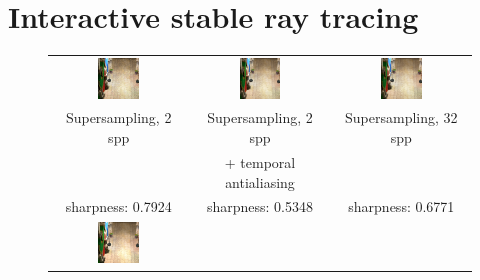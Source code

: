 \section{Interactive stable ray tracing}

\begin{figure}[t]
\begin{tabular}{@{}c@{}c@{}@{}c@{}}
	 \includegraphics[width=0.32\textwidth]{figures/ss_2x_rect_370_300_300_300_frame_211.png} &
		 \includegraphics[width=0.32\textwidth]{figures/ss_2x_taa_rect_370_300_300_300_frame_211.png} &
		  \includegraphics[width=0.32\textwidth]{figures/ss_32x_rect_370_300_300_300_frame_211.png} \\	 
Supersampling, 2 spp & Supersampling, 2 spp 	& Supersampling, 32 spp \\
  					 & + temporal antialiasing 	&  \\
sharpness: 0.7924 & sharpness: 0.5348 & sharpness: 0.6771  \\
	 \includegraphics[width=0.32\textwidth]{figures/srt_1_rect_370_300_300_300_frame_211.png} &

\end{tabular}
\end{figure}
